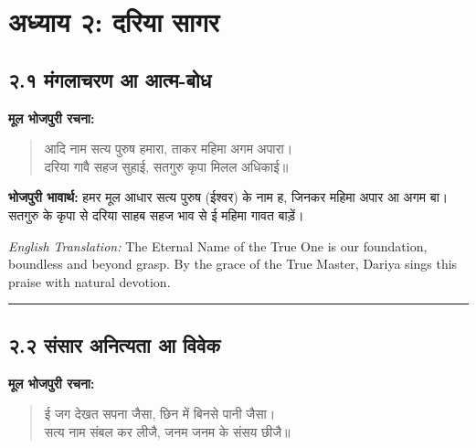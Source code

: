 
\cleardoublepage
\section*{अध्याय २: दरिया सागर}

\subsection*{२.१ मंगलाचरण आ आत्म-बोध}

\textbf{मूल भोजपुरी रचना:}

\begin{quote}
आदि नाम सत्य पुरुष हमारा, ताकर महिमा अगम अपारा।\\
दरिया गावै सहज सुहाई, सतगुरु कृपा मिलल अधिकाई॥
\end{quote}

\textbf{भोजपुरी भावार्थ:} हमर मूल आधार सत्य पुरुष (ईश्वर) के नाम ह, जिनकर महिमा अपार आ अगम बा। सतगुरु के कृपा से दरिया साहब सहज भाव से ई महिमा गावत बाड़ें।

\begin{sloppypar}
{\engfont \textit{English Translation:} The Eternal Name of the True One is our foundation, boundless and beyond grasp.
By the grace of the True Master, Dariya sings this praise with natural devotion.}
\end{sloppypar}

\begin{center}
{\color{bordercolor}\rule{0.4\textwidth}{0.4pt}}
\end{center}

\subsection*{२.२ संसार अनित्यता आ विवेक}

\textbf{मूल भोजपुरी रचना:}

\begin{quote}
ई जग देखत सपना जैसा, छिन में बिनसे पानी जैसा।\\
सत्य नाम संबल कर लीजै, जनम जनम के संसय छीजै॥
\end{quote}

